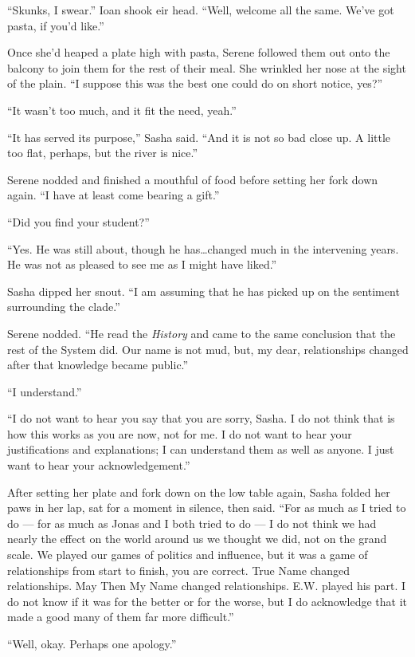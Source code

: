 ``Skunks, I swear.'' Ioan shook eir head. ``Well, welcome all the same. We've got pasta, if you'd like.''

Once she'd heaped a plate high with pasta, Serene followed them out onto the balcony to join them for the rest of their meal. She wrinkled her nose at the sight of the plain. ``I suppose this was the best one could do on short notice, yes?''

``It wasn't too much, and it fit the need, yeah.''

``It has served its purpose,'' Sasha said. ``And it is not so bad close up. A little too flat, perhaps, but the river is nice.''

Serene nodded and finished a mouthful of food before setting her fork down again. ``I have at least come bearing a gift.''

``Did you find your student?''

``Yes. He was still about, though he has\ldots changed much in the intervening years. He was not as pleased to see me as I might have liked.''

Sasha dipped her snout. ``I am assuming that he has picked up on the sentiment surrounding the clade.''

Serene nodded. ``He read the \emph{History} and came to the same conclusion that the rest of the System did. Our name is not mud, but, my dear, relationships changed after that knowledge became public.''

``I understand.''

``I do not want to hear you say that you are sorry, Sasha. I do not think that is how this works as you are now, not for me. I do not want to hear your justifications and explanations; I can understand them as well as anyone. I just want to hear your acknowledgement.''

After setting her plate and fork down on the low table again, Sasha folded her paws in her lap, sat for a moment in silence, then said. ``For as much as I tried to do — for as much as Jonas and I both tried to do — I do not think we had nearly the effect on the world around us we thought we did, not on the grand scale. We played our games of politics and influence, but it was a game of relationships from start to finish, you are correct. True Name changed relationships. May Then My Name changed relationships. E.W. played his part. I do not know if it was for the better or for the worse, but I do acknowledge that it made a good many of them far more difficult.''

``Well, okay. Perhaps one apology.''


